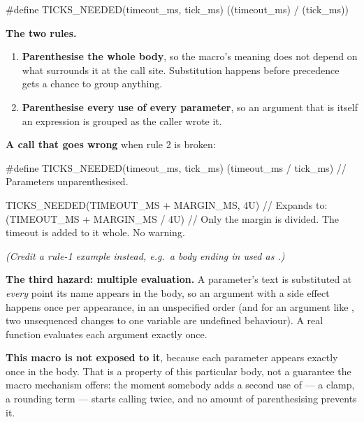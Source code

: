 \begin{ccode}
#define TICKS_NEEDED(timeout_ms, tick_ms) ((timeout_ms) / (tick_ms))
\end{ccode}
\noindent{}

\textbf{The two rules.} 
\begin{enumerate}
  \item \textbf{Parenthesise the whole body}, so the macro's meaning does not depend on what
    surrounds it at the call site. Substitution happens before precedence gets a chance to group
    anything.
  \item \textbf{Parenthesise every use of every parameter}, so an argument that is itself an
    expression is grouped as the caller wrote it.
\end{enumerate}

\textbf{A call that goes wrong} when rule 2 is broken:

\begin{ccode}
#define TICKS_NEEDED(timeout_ms, tick_ms) (timeout_ms / tick_ms) // Parameters unparenthesised.

TICKS_NEEDED(TIMEOUT_MS + MARGIN_MS, 4U)
// Expands to: (TIMEOUT_MS + MARGIN_MS / 4U)
// Only the margin is divided. The timeout is added to it whole. No warning.
\end{ccode}

{\itshape (Credit a rule-1 example instead, e.g.\ a body ending in  used as
.)\par}

\medskip
\textbf{The third hazard: multiple evaluation.} A parameter's text is substituted at \emph{every}
point its name appears in the body, so an argument with a side effect happens once per appearance,
in an unspecified order (and for an argument like , two unsequenced changes to one
variable are undefined behaviour). A real function evaluates each argument exactly once.

\textbf{This macro is not exposed to it}, because each parameter appears exactly once in the body.
That is a property of this particular body, not a guarantee the macro mechanism offers: the moment
somebody adds a second use of  --- a clamp, a rounding term ---
 starts calling  twice, and no amount of
parenthesising prevents it. 

